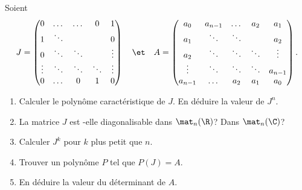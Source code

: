 \begin{enonce}
\begin{exercise}[ID={RMS126 E885},subtitle={ENSAM PSI 2015},tags={}]
Soient
\begin{equation*}
  J = 
  \begin{pmatrix}
  0      & \dots  & \dots  & 0      & 1      \\
  1      & \ddots &        &        & 0      \\
  0      & \ddots & \ddots &        & \vdots \\
  \vdots & \ddots & \ddots & \ddots & \vdots \\
  0      & \dots  & 0      & 1      & 0      \\ 
  \end{pmatrix}
  \quad\et\quad
  A=
  \begin{pmatrix}
  a_0     & a_{n-1} & \dots  & a_2    & a_1     \\
  a_1     & \ddots  & \ddots &        & a_2     \\
  a_2     & \ddots  & \ddots & \ddots & \vdots  \\
  \vdots  & \ddots  & \ddots & \ddots & a_{n-1} \\
  a_{n-1} & \dots   & a_2    & a_1    & a_0     \\
  \end{pmatrix}.
\end{equation*}
\begin{enumerate}
  \item Calculer le polynôme caractéristique de $J$. En déduire la valeur de $J^n$.
  \item La matrice $J$ est -elle diagonalisable dans $\mat_n(\R)$? Dans $\mat_n(\C)$?
  \item Calculer $J^k$ pour $k$ plus petit que $n$.
  \item Trouver un polynôme $P$ tel que $P(J)=A$.
  \item En déduire la valeur du déterminant de $A$.
\end{enumerate}
\end{exercise}
\begin{solution}
\end{solution}
\end{enonce}
